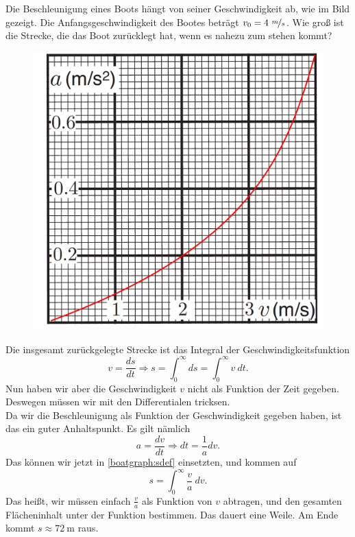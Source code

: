 \begin{Exercise}[label = boatgraph, origin = {Jaan Kalda, \url{http://www.ioc.ee/~kalda/ipho/}}, difficulty = 3, title = Bootsbewegung]
	Die Beschleunigung eines Boots hängt von seiner Geschwindigkeit ab, wie im Bild gezeigt. Die Anfangsgeschwindigkeit des Bootes beträgt $v_0 = 4~\nicefrac{m}{s}$. Wie groß ist die Strecke, die das Boot zurücklegt hat, wenn es nahezu zum stehen kommt?
\end{Exercise}
\begin{figure}[h]
	\centering
	\includegraphics[scale = 0.4]{../tasks/kalda/boatgraph1}
\end{figure}
\begin{Answer}[ref=boatgraph]
	Die insgesamt zurückgelegte Strecke ist das Integral der Geschwindigkeitsfunktion
	\begin{equation}\label{boatgraph:sdef}
		v = \frac{ds}{dt}\Rightarrow s = \int_{0}^{\infty}ds = \int_{0}^{\infty} v~dt.
	\end{equation}
	Nun haben wir aber die Geschwindigkeit $v$ nicht als Funktion der Zeit gegeben. Deswegen müssen wir mit den Differentialen tricksen.\\
	Da wir die Beschleunigung als Funktion der Geschwindigkeit gegeben haben, ist das ein guter Anhaltspunkt. Es gilt nämlich
	\begin{equation}\label{boatgraph:adef}
		a  = \frac{dv}{dt} \Rightarrow dt = \frac{1}{a} dv.
	\end{equation}
	Das können wir jetzt in \eqref{boatgraph:sdef} einsetzten, und kommen auf
	\begin{equation}
		s = \int_{0}^{\infty} \frac{v}{a}~dv.
	\end{equation}
	Das heißt, wir müssen einfach $\frac{v}{a}$ als Funktion von $v$ abtragen, und den gesamten Flächeninhalt unter der Funktion bestimmen. Das dauert eine Weile. Am Ende kommt $s\approx 72~\mathrm{m}$ raus.
\end{Answer}